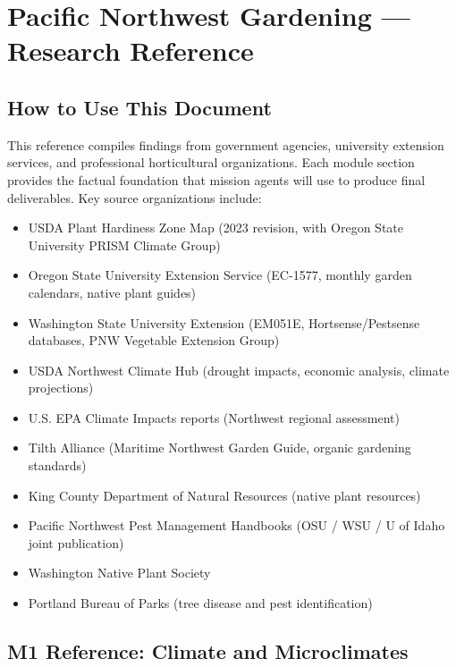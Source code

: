 \documentclass[11pt,letterpaper]{article}
\newcommand{\stageheader}[2]{%
  \noindent\colorbox{#2}{\makebox[\textwidth][l]{%
    \textcolor{white}{\bfseries\sffamily\hspace{6pt}#1\hspace{6pt}}}}%
  \vspace{0.5em}\par%
}
\begin{document}
\newpage

\stageheader{STAGE 2 --- RESEARCH REFERENCE}{secondary}

\section{Pacific Northwest Gardening --- Research Reference}

\subsection{How to Use This Document}

This reference compiles findings from government agencies, university extension services, and professional horticultural organizations. Each module section provides the factual foundation that mission agents will use to produce final deliverables. Key source organizations include:

\begin{itemize}[leftmargin=2em]
  \item USDA Plant Hardiness Zone Map (2023 revision, with Oregon State University PRISM Climate Group)
  \item Oregon State University Extension Service (EC-1577, monthly garden calendars, native plant guides)
  \item Washington State University Extension (EM051E, Hortsense/Pestsense databases, PNW Vegetable Extension Group)
  \item USDA Northwest Climate Hub (drought impacts, economic analysis, climate projections)
  \item U.S. EPA Climate Impacts reports (Northwest regional assessment)
  \item Tilth Alliance (Maritime Northwest Garden Guide, organic gardening standards)
  \item King County Department of Natural Resources (native plant resources)
  \item Pacific Northwest Pest Management Handbooks (OSU / WSU / U of Idaho joint publication)
  \item Washington Native Plant Society
  \item Portland Bureau of Parks (tree disease and pest identification)
\end{itemize}

\subsection{M1 Reference: Climate and Microclimates}
\end{document}
